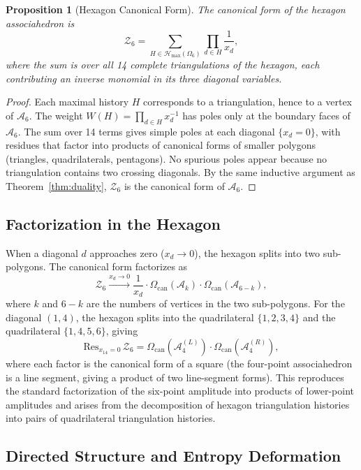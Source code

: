 \documentclass[12pt, oneside]{amsart}
\theoremstyle{plain}
\newtheorem{proposition}[theorem]{Proposition}
\theoremstyle{definition}
\theoremstyle{remark}
\newcommand{\OmKS}{\Omega}
\newcommand{\CF}{\Omega_{\mathrm{can}}}
\newcommand{\Hmax}{\mathcal{H}_{\max}}
\begin{document}
\begin{proposition}[Hexagon Canonical Form]
\label{prop:hexagon}
The canonical form of the hexagon associahedron is
\begin{equation}
\label{eq:hexagon-Z}
  \mathcal{Z}_6 = \sum_{H \in \Hmax(\OmKS_6)} \prod_{d \in H} \frac{1}{x_d},
\end{equation}
where the sum is over all 14 complete triangulations of the hexagon, each contributing an inverse monomial in its three diagonal variables.
\end{proposition}

\begin{proof}
Each maximal history $H$ corresponds to a triangulation, hence to a vertex of $\mathcal{A}_6$. The weight $W(H) = \prod_{d \in H} x_d^{-1}$ has poles only at the boundary faces of $\mathcal{A}_6$. The sum over 14 terms gives simple poles at each diagonal $\{x_d = 0\}$, with residues that factor into products of canonical forms of smaller polygons (triangles, quadrilaterals, pentagons). No spurious poles appear because no triangulation contains two crossing diagonals. By the same inductive argument as Theorem~\ref{thm:duality}, $\mathcal{Z}_6$ is the canonical form of $\mathcal{A}_6$.
\end{proof}

\subsection{Factorization in the Hexagon}

When a diagonal $d$ approaches zero ($x_d \to 0$), the hexagon splits into two sub-polygons. The canonical form factorizes as
\[
  \mathcal{Z}_6 \xrightarrow{x_d \to 0} \frac{1}{x_d} \cdot \CF(\mathcal{A}_{k}) \cdot \CF(\mathcal{A}_{6-k}),
\]
where $k$ and $6-k$ are the numbers of vertices in the two sub-polygons. For the diagonal $(1,4)$, the hexagon splits into the quadrilateral $\{1,2,3,4\}$ and the quadrilateral $\{1,4,5,6\}$, giving
\[
  \mathrm{Res}_{x_{14}=0}\,\mathcal{Z}_6 = \CF(\mathcal{A}_4^{(L)}) \cdot \CF(\mathcal{A}_4^{(R)}),
\]
where each factor is the canonical form of a square (the four-point associahedron is a line segment, giving a product of two line-segment forms). This reproduces the standard factorization of the six-point amplitude into products of lower-point amplitudes and arises from the decomposition of hexagon triangulation histories into pairs of quadrilateral triangulation histories.

\subsection{Directed Structure and Entropy Deformation}
\end{document}
